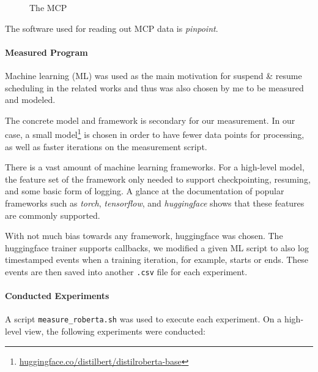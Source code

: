 \begin{figure}
    \caption[short]{The MCP}
    \label{fig:mcp}
\end{figure}


The software used for reading out MCP data is \emph{pinpoint}\cite{kohler_pinpoint_2020}.

\paragraph{Measured Program}

Machine learning (ML) was used as the main motivation for suspend \& resume scheduling in the related works\cite {wiesner_lets_2021} and thus was also chosen by me to be measured and modeled. 

The concrete model and framework is secondary for our measurement. In our case, a small model\footnote{\url{huggingface.co/distilbert/distilroberta-base}} is chosen in order to have fewer data points for processing, as well as faster iterations on the measurement script. 

There is a vast amount of machine learning frameworks. 
For a high-level model, the feature set of the framework only needed to support checkpointing, resuming, and some basic form of logging. 
A glance at the documentation of popular frameworks such as \emph{torch}, \emph{tensorflow}, and \emph{huggingface} shows that these features are commonly supported. 

With not much bias towards any framework, huggingface was chosen.
The huggingface trainer supports callbacks, we modified a given ML script to also log timestamped events when a training iteration, for example, starts or ends. 
These events are then saved into another \verb|.csv| file for each experiment.

\paragraph{Conducted Experiments}

A script \verb|measure_roberta.sh| was used to execute each experiment. 
On a high-level view, the following experiments were conducted: 

